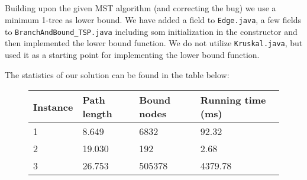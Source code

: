 \documentclass[11pt]{article}
\begin{document}
\subsection{}
Building upon the given MST algorithm (and correcting the bug) we use 
a minimum 1-tree as lower bound. We have added a field to {\tt Edge.java},
a few fields to {\tt BranchAndBound\_TSP.java} including som initialization in
the constructor and then implemented the lower bound function. We do not utilize
{\tt Kruskal.java}, but used it as a starting point for implementing the lower
bound function.

The statistics of our solution can be found in the table below:
\begin{figure}[H]
    \centering
    \begin{tabular}{llll}
        \toprule
        Instance    & Path length   & Bound nodes   & Running time (ms) \\
        \midrule
        1           & 8.649         & 6832          & 92.32             \\
        2           & 19.030        & 192           & 2.68              \\
        3           & 26.753        & 505378        & 4379.78           \\
        \bottomrule
    \end{tabular}
\end{figure}
\end{document}
